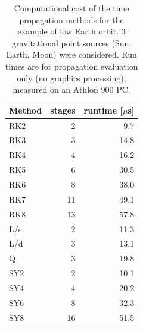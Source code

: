 \documentclass[Orbiter Technical Reference.tex]{subfiles}
\begin{document}
\begin{table}[H]\centering
\begin{tabular}{l|rr}
Method & stages & runtime [$\mu$s] \\ \hline
RK2 & 2 & 9.7 \\
RK3 & 3 & 14.8 \\
RK4 & 4 & 16.2 \\
RK5 & 6 & 30.5 \\
RK6 & 8 & 38.0 \\
RK7 & 11 & 49.1 \\
RK8 & 13 & 57.8 \\ \hline
L/s & 2 & 11.3 \\
L/d & 3 & 13.1 \\
Q & 3 & 19.8 \\ \hline
SY2 & 2 & 10.1 \\
SY4 & 4 & 20.2 \\
SY6 & 8 & 32.3 \\
SY8 & 16 & 51.5
\end{tabular}
\caption{Computational cost of the time propagation methods for the example of low Earth orbit. 3 gravitational point sources (Sun, Earth, Moon) were considered. Run times are for propagation evaluation only (no graphics processing), measured on an Athlon 900 PC.}
\end{table}
\end{document}

